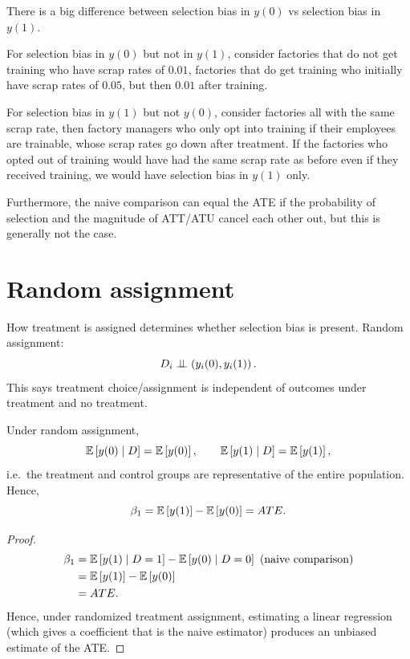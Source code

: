 \begin{remark}	There is a big difference between selection bias in $y(0)$ vs selection bias in $y(1)$.
	
	For selection bias in $y(0)$ but not in $y(1)$, consider factories that do not get training who have scrap rates of $0.01$, factories that do get training who initially have scrap rates of $0.05$, but then $0.01$ after training.

	For selection bias in $y(1)$ but not $y(0)$, consider factories all with the same scrap rate, then factory managers who only opt into training if their employees are trainable, whose scrap rates go down after treatment. If the factories who opted out of training would have had the same scrap rate as before even if they received training, we would have selection bias in $y(1)$ only.

	Furthermore, the naive comparison can equal the ATE if the probability of selection and the magnitude of ATT/ATU cancel each other out, but this is generally not the case.
\end{remark}

\section{Random assignment}

\begin{definition}
	How treatment is assigned determines whether selection bias is present. Random assignment:
	\[
		D_i \perp\!\!\!\perp \left(y_i(0), y_i(1)\right)
	.\]
	This says treatment choice/assignment is independent of outcomes under treatment and no treatment.
\end{definition}

\begin{proposition}[Random assignment implies $\beta_1 = ATE$]
	Under random assignment,
	\[
		\mathbb{E}\left[y(0) \mid D\right] = \mathbb{E}\left[y(0)\right], \qquad
		\mathbb{E}\left[y(1) \mid D\right] = \mathbb{E}\left[y(1)\right]
	,\]
	i.e.\ the treatment and control groups are representative of the entire population. Hence,
	\[
		\beta_1 = \mathbb{E}\left[y(1)\right] - \mathbb{E}\left[y(0)\right] = ATE
	.\]
\end{proposition}
\begin{proof}
	\begin{align*}
		\beta_1
		&= \mathbb{E}\left[y(1) \mid D=1\right] - \mathbb{E}\left[y(0) \mid D=0\right] \text{ (naive comparison)}\\
		&= \mathbb{E}\left[y(1)\right] - \mathbb{E}\left[y(0)\right] \\
		&= ATE
	.\end{align*}
	Hence, under randomized treatment assignment, estimating a linear regression (which gives a coefficient that is the naive estimator) produces an unbiased estimate of the ATE.
\end{proof}

